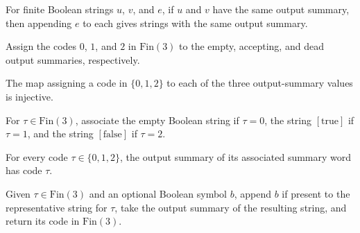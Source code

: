 \begin{theorem}
\label{Turing.outSummary_append_congr}
\leanok
{}
For finite Boolean strings $u$, $v$, and $e$, if $u$ and $v$ have the same output
summary, then appending $e$ to each gives strings with the same output summary.
\end{theorem}

\begin{definition}
\label{Turing.outSummaryCode}
\leanok
{}
Assign the codes $0$, $1$, and $2$ in $\text{Fin}(3)$ to the empty, accepting, and dead
output summaries, respectively.
\end{definition}

\begin{theorem}
\label{Turing.outSummaryCode_injective}
\leanok
{}
The map assigning a code in $\{0,1,2\}$ to each of the three output-summary values is
injective.
\end{theorem}

\begin{definition}
\label{Turing.summaryWord}
\leanok
For $\tau\in\text{Fin}(3)$, associate the empty Boolean string if $\tau=0$, the string
$[\mathrm{true}]$ if $\tau=1$, and the string $[\mathrm{false}]$ if $\tau=2$.
\end{definition}

\begin{theorem}
\label{Turing.outSummaryCode_summaryWord}
\leanok
{}
For every code $\tau\in\{0,1,2\}$, the output summary of its associated summary word has
code $\tau$.
\end{theorem}

\begin{definition}
\label{Turing.summaryTag}
\leanok
{}
Given $\tau\in\text{Fin}(3)$ and an optional Boolean symbol $b$, append $b$ if present
to the representative string for $\tau$, take the output summary of the resulting
string, and return its code in $\text{Fin}(3)$.
\end{definition}

